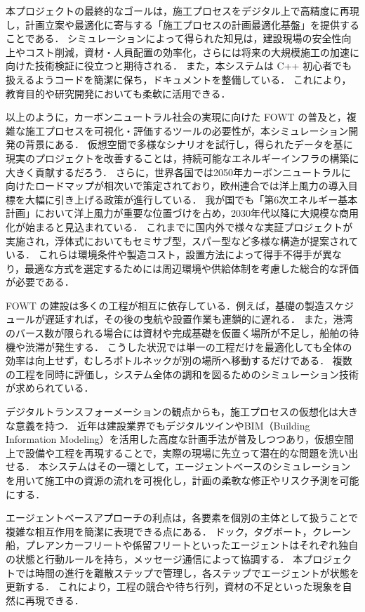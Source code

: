 \documentclass[10pt,letterpaper]{jsarticle}
\begin{document}
本プロジェクトの最終的なゴールは，施工プロセスをデジタル上で高精度に再現し，計画立案や最適化に寄与する「施工プロセスの計画最適化基盤」を提供することである．
シミュレーションによって得られた知見は，建設現場の安全性向上やコスト削減，資材・人員配置の効率化，さらには将来の大規模施工の加速に向けた技術検証に役立つと期待される．
また，本システムは C++ 初心者でも扱えるようコードを簡潔に保ち，ドキュメントを整備している．
これにより，教育目的や研究開発においても柔軟に活用できる．

以上のように，カーボンニュートラル社会の実現に向けた FOWT の普及と，複雑な施工プロセスを可視化・評価するツールの必要性が，本シミュレーション開発の背景にある．
仮想空間で多様なシナリオを試行し，得られたデータを基に現実のプロジェクトを改善することは，持続可能なエネルギーインフラの構築に大きく貢献するだろう．
さらに，世界各国では2050年カーボンニュートラルに向けたロードマップが相次いで策定されており，欧州連合では洋上風力の導入目標を大幅に引き上げる政策が進行している．
我が国でも「第6次エネルギー基本計画」において洋上風力が重要な位置づけを占め，2030年代以降に大規模な商用化が始まると見込まれている．
これまでに国内外で様々な実証プロジェクトが実施され，浮体式においてもセミサブ型，スパー型など多様な構造が提案されている．
これらは環境条件や製造コスト，設置方法によって得手不得手が異なり，最適な方式を選定するためには周辺環境や供給体制を考慮した総合的な評価が必要である．

FOWT の建設は多くの工程が相互に依存している．例えば，基礎の製造スケジュールが遅延すれば，その後の曳航や設置作業も連鎖的に遅れる．
また，港湾のバース数が限られる場合には資材や完成基礎を仮置く場所が不足し，船舶の待機や渋滞が発生する．
こうした状況では単一の工程だけを最適化しても全体の効率は向上せず，むしろボトルネックが別の場所へ移動するだけである．
複数の工程を同時に評価し，システム全体の調和を図るためのシミュレーション技術が求められている．

デジタルトランスフォーメーションの観点からも，施工プロセスの仮想化は大きな意義を持つ．
近年は建設業界でもデジタルツインやBIM（Building Information Modeling）を活用した高度な計画手法が普及しつつあり，仮想空間上で設備や工程を再現することで，実際の現場に先立って潜在的な問題を洗い出せる．
本システムはその一環として，エージェントベースのシミュレーションを用いて施工中の資源の流れを可視化し，計画の柔軟な修正やリスク予測を可能にする．

エージェントベースアプローチの利点は，各要素を個別の主体として扱うことで複雑な相互作用を簡潔に表現できる点にある．
ドック，タグボート，クレーン船，プレアンカーフリートや係留フリートといったエージェントはそれぞれ独自の状態と行動ルールを持ち，メッセージ通信によって協調する．
本プロジェクトでは時間の進行を離散ステップで管理し，各ステップでエージェントが状態を更新する．
これにより，工程の競合や待ち行列，資材の不足といった現象を自然に再現できる．
\end{document}
